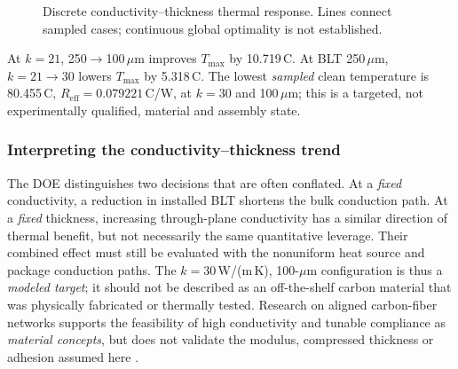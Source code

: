 \documentclass[10pt,a4paper]{article}
\newcommand{\Tmax}{T_{\mathrm{max}}}
\newcommand{\Reff}{R_{\mathrm{eff}}}
\begin{document}
\begin{figure}[htbp]\centering
{}
\caption{Discrete conductivity--thickness thermal response. Lines connect sampled cases; continuous global optimality is not established.}
\label{fig:thermal}
\end{figure}
\FloatBarrier
At $k=21$, 250$\rightarrow$100\,$\mu$m improves $\Tmax$ by 10.719\,\textdegree C.
At BLT 250\,$\mu$m, $k=21\rightarrow30$ lowers $\Tmax$ by 5.318\,\textdegree C.
The lowest \emph{sampled} clean temperature is 80.455\,\textdegree C,
$\Reff=0.079221$\,\textdegree C/W, at $k=30$ and 100\,$\mu$m;
this is a targeted, not experimentally qualified, material and assembly state.


\subsubsection{Interpreting the conductivity--thickness trend}
The DOE distinguishes two decisions that are often conflated. At a \emph{fixed} conductivity,
a reduction in installed BLT shortens the bulk conduction path. At a \emph{fixed} thickness,
increasing through-plane conductivity has a similar direction of thermal benefit, but not
necessarily the same quantitative leverage. Their combined effect must still be evaluated
with the nonuniform heat source and package conduction paths.
The $k=30$\,W/(m\,K), 100-$\mu$m configuration is thus a \emph{modeled target}; it should
not be described as an off-the-shelf carbon material that was physically fabricated or
thermally tested. Research on aligned carbon-fiber networks supports the feasibility of
high conductivity and tunable compliance as \emph{material concepts}, but does not
validate the modulus, compressed thickness or adhesion assumed here
\citep{li2023,yi2025,subramanian2019}.
\end{document}
